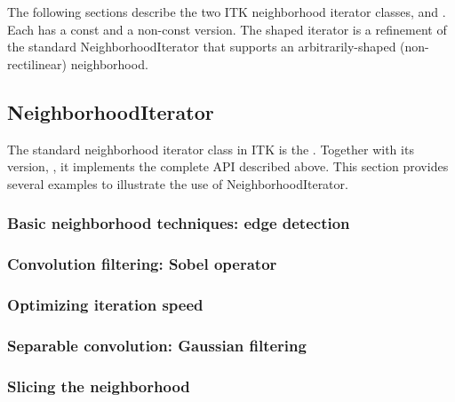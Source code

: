 {The following sections describe the two ITK neighborhood iterator classes,
 and .
Each has a const and a non-const version.  The shaped iterator is a refinement
of the standard NeighborhoodIterator that supports an
arbitrarily-shaped (non-rectilinear) neighborhood.

\subsection{NeighborhoodIterator}
\label{sec:itkNeighborhoodIterator}

The standard neighborhood iterator class in ITK is the
.  Together with its  version,
, it implements the complete API
described above.  This section provides several examples to illustrate the use
of NeighborhoodIterator.

\subsubsection{Basic neighborhood techniques: edge detection}
\label{sec:NeighborhoodExample1}
%

\subsubsection{Convolution filtering: Sobel operator}
\label{sec:NeighborhoodExample2}
%

\subsubsection{Optimizing iteration speed}
\label{sec:NeighborhoodExample3}
%

\subsubsection{Separable convolution: Gaussian filtering}
\label{sec:NeighborhoodExample4}
%

\subsubsection{Slicing the neighborhood}
\label{sec:NeighborhoodExample5}
%

}
